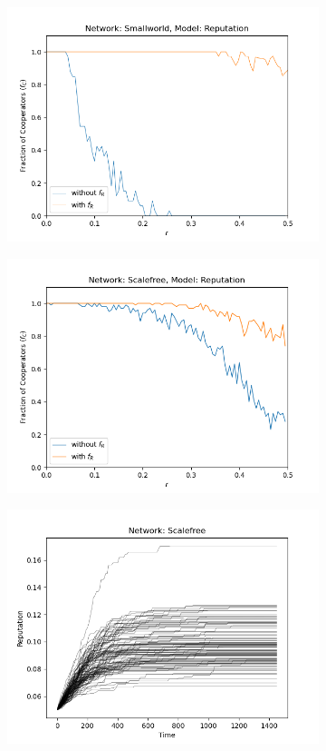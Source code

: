 \documentclass[11pt, A4 paper, twocolumn ]{article}
\begin{document}
\begin{figure}[p]
\begin{subfigure}[b]{0.3\textwidth}
	\includegraphics[width=\textwidth]{graphs/sw-fr}
	\caption{}
	\label{fig:sw-fr}
\end{subfigure}
\begin{subfigure}[b]{0.3\textwidth}
	\centering
	\includegraphics[width=\textwidth]{graphs/sf-fr}
	\caption{}
	\label{fig:sf-fr}
\end{subfigure}
\begin{subfigure}[b]{0.3\textwidth}
	\centering
	\includegraphics[width=\textwidth]{graphs/rep_te_sfp0.0}

\end{subfigure}
\end{figure}
\end{document}
